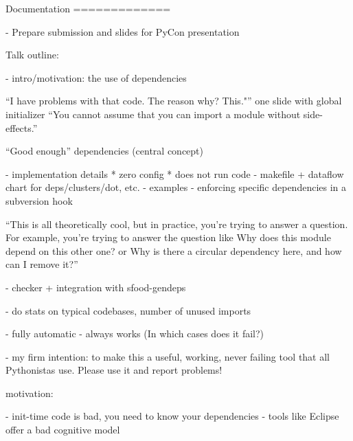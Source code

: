 

Documentation
=============

- Prepare submission and slides for PyCon presentation

  Talk outline:

  - intro/motivation: the use of dependencies



 ``I have problems with that code. The reason why?
  This."''
one slide with global initializer
  ``You cannot assume that you can import a module without
side-effects.''


``Good enough'' dependencies (central concept)



  - implementation details
    * zero config
    * does not run code
  - makefile + dataflow chart for deps/clusters/dot, etc.
  - examples
  - enforcing specific dependencies in a subversion hook

``This is all theoretically cool, but in practice, you're trying to
  answer a question.  For example, you're trying to answer the
  question like Why does this module depend on this other one? or Why
  is there a circular dependency here, and how can I remove it?''


- checker + integration with sfood-gendeps

  - do stats on typical codebases, number of unused imports

- fully automatic
- always works (In which cases does it fail?)


- my firm intention: to make this a useful, working, never failing
  tool that all Pythonistas use. Please use it and report problems!




motivation:

- init-time code is bad, you need to know your dependencies
- tools like Eclipse offer a bad cognitive model

